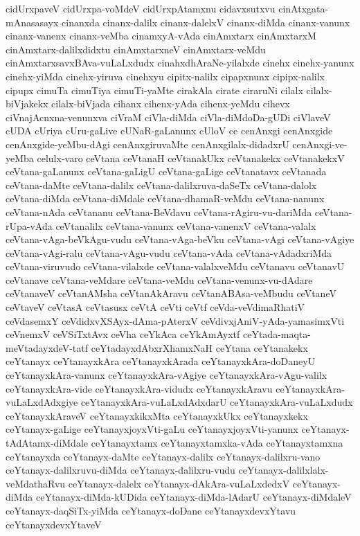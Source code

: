 {cidUrxpaveV
cidUrxpa-voMdeV
cidUrxpAtamxnu
cidavxsutxvu
cinAtxgata-mAnasasayx
cinanxda
cinanx-dalilx
cinanx-dalelxV
cinanx-diMda
cinanx-vanunx
cinanx-vanenx
cinanx-veMba
cinamxyA-vAda
cinAmxtarx
cinAmxtarxM
cinAmxtarx-dalilxdidxtu
cinAmxtarxneV
cinAmxtarx-veMdu
cinAmxtarxsavxBAva-vuLaLxdudx
cinahxdhAraNe-yilalxde
cinehx
cinehx-yanunx
cinehx-yiMda
cinehx-yiruva
cinehxyu
cipitx-nalilx
cipapxnunx
cipipx-nalilx
cipupx
cimuTa
cimuTiya
cimuTi-yaMte
cirakAla
cirate
ciraruNi
cilalx
cilalx-biVjakekx
cilalx-biVjada
cihanx
cihenx-yAda
cihenx-yeMdu
cihevx
ciVnajAcnxna-venunxva
ciVraM
ciVla-diMda
ciVla-diMdoDa-gUDi
ciVlaveV
cUDA
cUriya
cUru-gaLive
cUNaR-gaLanunx
cUloV
ce
cenAnxgi
cenAnxgide
cenAnxgide-yeMbu-dAgi
cenAnxgiruvaMte
cenAnxgilalx-didadxrU
cenAnxgi-ve-yeMba
celulx-varo
ceVtana
ceVtanaH
ceVtanakUkx
ceVtanakekx
ceVtanakekxV
ceVtana-gaLanunx
ceVtana-gaLigU
ceVtana-gaLige
ceVtanatavx
ceVtanada
ceVtana-daMte
ceVtana-dalilx
ceVtana-dalilxruva-daSeTx
ceVtana-dalolx
ceVtana-diMda
ceVtana-diMdale
ceVtana-dhamaR-veMdu
ceVtana-nanunx
ceVtana-nAda
ceVtananu
ceVtana-BeVdavu
ceVtana-rAgiru-vu-dariMda
ceVtana-rUpa-vAda
ceVtanalilx
ceVtana-vanunx
ceVtana-vanenxV
ceVtana-valalx
ceVtana-vAga-beVkAgu-vudu
ceVtana-vAga-beVku
ceVtana-vAgi
ceVtana-vAgiye
ceVtana-vAgi-ralu
ceVtana-vAgu-vudu
ceVtana-vAda
ceVtana-vAdadxriMda
ceVtana-viruvudo
ceVtana-vilalxde
ceVtana-valalxveMdu
ceVtanavu
ceVtanavU
ceVtanave
ceVtana-veMdare
ceVtana-veMdu
ceVtana-venunx-vu-dAdare
ceVtanaveV
ceVtanAMsha
ceVtanAkAravu
ceVtanABAsa-veMbudu
ceVtaneV
ceVtaveV
ceVtasA
ceVtasusx
ceVtA
ceVti
ceVtf
ceVda-veVdimaRhatiV
ceVdasemxY
ceVdidxvXSAyx-dAma-pAterxV
ceVdivxjAniV-yAda-yamasimxVti
ceVnemxV
ceVSiTxtAvx
ceVha
ceYkAca
ceYkAmAyxtf
ceYtada-maqta-meVtadayxdeV-tatf
ceYtadayxdAbxrXhamxNaH
ceYtana
ceYtanakekx
ceYtanayx
ceYtanayxkAra
ceYtanayxkArada
ceYtanayxkAra-doDaneyU
ceYtanayxkAra-vanunx
ceYtanayxkAra-vAgiye
ceYtanayxkAra-vAgu-valilx
ceYtanayxkAra-vide
ceYtanayxkAra-vidudx
ceYtanayxkAravu
ceYtanayxkAra-vuLaLxdAdxgiye
ceYtanayxkAra-vuLaLxdAdxdarU
ceYtanayxkAra-vuLaLxdudx
ceYtanayxkAraveV
ceYtanayxkikxMta
ceYtanayxkUkx
ceYtanayxkekx
ceYtanayx-gaLige
ceYtanayxjoyxVti-gaLu
ceYtanayxjoyxVti-yanunx
ceYtanayx-tAdAtamx-diMdale
ceYtanayxtamx
ceYtanayxtamxka-vAda
ceYtanayxtamxna
ceYtanayxda
ceYtanayx-daMte
ceYtanayx-dalilx
ceYtanayx-dalilxru-vano
ceYtanayx-dalilxruvu-diMda
ceYtanayx-dalilxru-vudu
ceYtanayx-dalilxlalx-veMdathaRvu
ceYtanayx-dalelx
ceYtanayx-dAkAra-vuLaLxdedxV
ceYtanayx-diMda
ceYtanayx-diMda-kUDida
ceYtanayx-diMda-lAdarU
ceYtanayx-diMdaleV
ceYtanayx-daqSiTx-yiMda
ceYtanayx-doDane
ceYtanayxdevxYtavu
ceYtanayxdevxYtaveV
}
